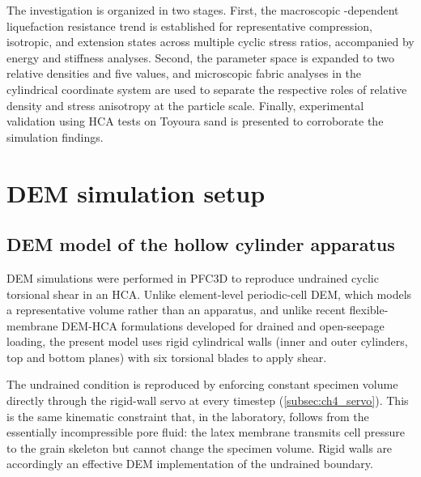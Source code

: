 \documentclass[../main]{subfiles}
\begin{document}
The investigation is organized in two stages. First, the macroscopic \Kzero{}-dependent liquefaction resistance trend is established for representative compression, isotropic, and extension states across multiple cyclic stress ratios, accompanied by energy and stiffness analyses. Second, the parameter space is expanded to two relative densities and five \Kzero{} values, and microscopic fabric analyses in the cylindrical coordinate system are used to separate the respective roles of relative density and stress anisotropy at the particle scale. Finally, experimental validation using HCA tests on Toyoura sand is presented to corroborate the simulation findings.


\section{DEM simulation setup}
\label{sec:ch4_dem_setup}

\subsection{DEM model of the hollow cylinder apparatus}
\label{subsec:ch4_dem_hca}

DEM simulations were performed in \textsc{PFC3D} \citep{Itasca2021} to reproduce undrained cyclic torsional shear in an HCA. Unlike element-level periodic-cell DEM, which models a representative volume rather than an apparatus, and unlike recent flexible-membrane DEM-HCA formulations \citep{Song2024,Song2024suffusion} developed for drained and open-seepage loading, the present model uses rigid cylindrical walls (inner and outer cylinders, top and bottom planes) with six torsional blades to apply shear.

The undrained condition is reproduced by enforcing constant specimen volume directly through the rigid-wall servo at every timestep (\cref{subsec:ch4_servo}). This is the same kinematic constraint that, in the laboratory, follows from the essentially incompressible pore fluid: the latex membrane transmits cell pressure to the grain skeleton but cannot change the specimen volume. Rigid walls are accordingly an effective DEM implementation of the undrained boundary.
\end{document}
